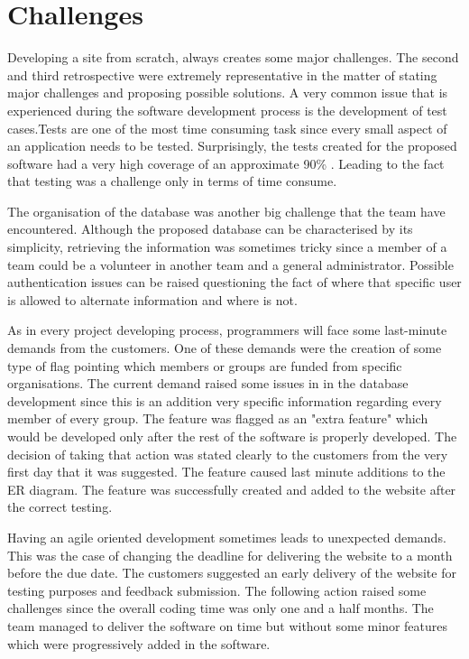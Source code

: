 \documentclass{l3proj}
\begin{document}

\section{Challenges}
\label{challenges}

Developing a site from scratch, always creates some major challenges. The second and third retrospective were extremely representative in the matter of stating major challenges and proposing possible solutions. A very common issue that is experienced during the software development process is the development of test cases.Tests are one of the most time consuming task since every small aspect of an application needs to be tested. Surprisingly, the tests created for the proposed software had a very high coverage of an approximate 90\% . Leading to the fact that testing was a challenge only in terms of time consume.

The organisation of the database was another big challenge that the team have encountered. Although the proposed database can be characterised by its simplicity, retrieving the information was sometimes tricky since a member of a team could be a volunteer in another team and a general administrator. Possible authentication issues can be raised questioning the fact of where that specific user is allowed to alternate information and where is not.

As in every project developing process, programmers will face some last-minute demands from the customers. One of these demands were the creation of some type of flag pointing which members or groups are funded from specific organisations. The current demand raised some issues in in the database development since this is an addition very specific information regarding every member of every group. The feature was flagged as an  "extra feature" which would be developed only after the rest of the software is properly developed. The decision of taking that action was stated clearly to the customers from the very first day that it was suggested. The feature caused last minute additions to the ER diagram. The feature was successfully created and added to the website after the correct testing.

Having an agile oriented development sometimes leads to unexpected demands. This was the case of changing the deadline for delivering the website to a month before the due date. The customers suggested an early delivery of the website for testing purposes and feedback submission. The following action raised some challenges since the overall coding time was only one and a half months. The team managed to deliver the software on time but without some minor features which were progressively added in the software.
\end{document}
